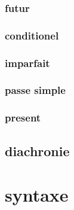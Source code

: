 \documentclass[a4paper]{report}
\theoremstyle{definition}
\theoremstyle{remark}
\begin{document}
\subsubsection{futur}

\subsubsection{conditionel}

\subsubsection{imparfait}

\subsubsection{passe simple}

\subsubsection{present}

\subsection{diachronie}

\section{syntaxe}


\printbibliography
\end{document}
